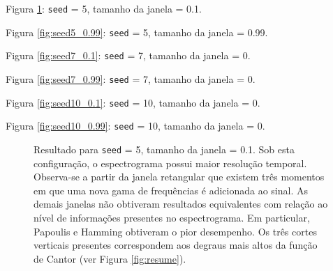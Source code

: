 Figura \ref{fig:seed5_0.1}: \texttt{seed} = 5, tamanho da janela = 0.1.

Figura \ref{fig:seed5_0.99}: \texttt{seed} = 5, tamanho da janela = 0.99.

Figura \ref{fig:seed7_0.1}: \texttt{seed} = 7, tamanho da janela = 0.

Figura \ref{fig:seed7_0.99}: \texttt{seed} = 7, tamanho da janela = 0.

Figura \ref{fig:seed10_0.1}: \texttt{seed} = 10, tamanho da janela = 0.

Figura \ref{fig:seed10_0.99}: \texttt{seed} = 10, tamanho da janela = 0.

\begin{figure}[ht!]
	\vspace{1mm}	
	\begin{center}
	\end{center}
	\vspace{1mm}	
	\caption{Resultado para \texttt{seed} = 5, tamanho da janela = 0.1. Sob esta configuração, o espectrograma possui maior resolução temporal. Observa-se a partir da janela retangular que existem três momentos em que uma nova gama de frequências é adicionada ao sinal. As demais janelas não obtiveram resultados equivalentes com relação ao nível de informações presentes no espectrograma. Em particular, Papoulis e Hamming obtiveram o pior desempenho. Os três cortes verticais presentes correspondem aos degraus mais altos da função de Cantor (ver Figura \ref{fig:resume}).}
	\label{fig:seed5_0.1}
\end{figure}
